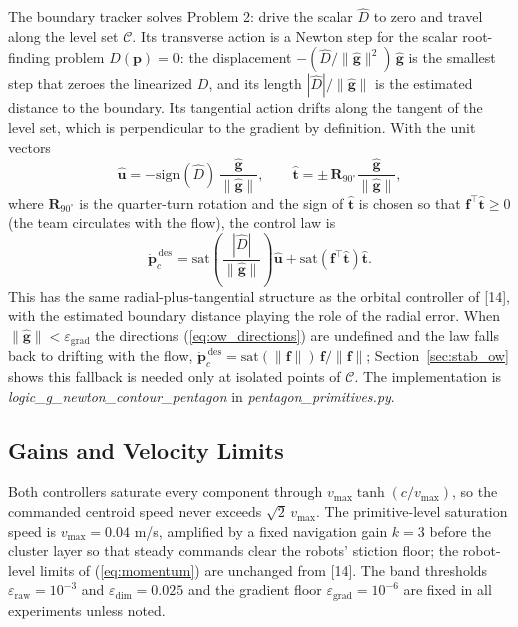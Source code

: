 \documentclass[lettersize,journal]{IEEEtran}
\begin{document}
The boundary tracker solves Problem 2: drive the scalar $\hat{D}$ to
zero and travel along the level set $\mathcal{C}$. Its transverse
action is a Newton step for the scalar root-finding problem
$D(\mathbf{p}) = 0$: the displacement
$-(\hat{D}/\|\hat{\mathbf{g}}\|^2)\,\hat{\mathbf{g}}$ is the smallest
step that zeroes the linearized $D$, and its length
$|\hat{D}|/\|\hat{\mathbf{g}}\|$ is the estimated distance to the
boundary. Its tangential action drifts along the tangent of the level
set, which is perpendicular to the gradient by definition. With the
unit vectors
\begin{equation}
    \hat{\mathbf{u}} = -\mathrm{sign}(\hat{D})\,
    \frac{\hat{\mathbf{g}}}{\|\hat{\mathbf{g}}\|},
    \qquad
    \hat{\mathbf{t}} = \pm\,\mathbf{R}_{90^\circ}
    \frac{\hat{\mathbf{g}}}{\|\hat{\mathbf{g}}\|},
    \label{eq:ow_directions}
\end{equation}
where $\mathbf{R}_{90^\circ}$ is the quarter-turn rotation and the sign
of $\hat{\mathbf{t}}$ is chosen so that $\mathbf{f}^\top
\hat{\mathbf{t}} \geq 0$ (the team circulates with the flow), the
control law is
\begin{equation}
    \dot{\mathbf{p}}_c^{\,\text{des}} =
    \mathrm{sat}\!\left(\frac{|\hat{D}|}{\|\hat{\mathbf{g}}\|}\right)
    \hat{\mathbf{u}}
    + \mathrm{sat}\!\left(\mathbf{f}^\top \hat{\mathbf{t}}\right)
    \hat{\mathbf{t}}.
    \label{eq:ow_law}
\end{equation}
This has the same radial-plus-tangential structure as the orbital
controller of [14], with the estimated boundary distance playing the
role of the radial error. When $\|\hat{\mathbf{g}}\| <
\varepsilon_{\text{grad}}$ the directions (\ref{eq:ow_directions}) are
undefined and the law falls back to drifting with the flow,
$\dot{\mathbf{p}}_c^{\,\text{des}} = \mathrm{sat}(\|\mathbf{f}\|)\,
\mathbf{f}/\|\mathbf{f}\|$; Section~\ref{sec:stab_ow} shows this
fallback is needed only at isolated points of $\mathcal{C}$. The
implementation is \textit{logic\_g\_newton\_contour\_pentagon} in
\textit{pentagon\_primitives.py}.

\subsection{Gains and Velocity Limits}

Both controllers saturate every component through $v_{\max}\tanh(c /
v_{\max})$, so the commanded centroid speed never exceeds
$\sqrt{2}\,v_{\max}$. The primitive-level saturation speed is $v_{\max}
= 0.04$ m/s, amplified by a fixed navigation gain $k = 3$ before the
cluster layer so that steady commands clear the robots' stiction floor;
the robot-level limits of (\ref{eq:momentum}) are unchanged from [14].
The band thresholds $\varepsilon_{\text{raw}} = 10^{-3}$ and
$\varepsilon_{\text{dim}} = 0.025$ and the gradient floor
$\varepsilon_{\text{grad}} = 10^{-6}$ are fixed in all experiments
unless noted.
\end{document}
